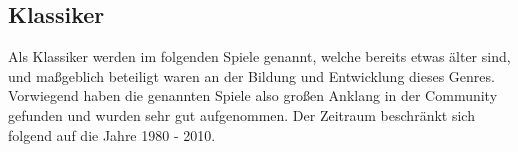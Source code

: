 \subsection{Klassiker}
Als Klassiker werden im folgenden Spiele genannt, welche bereits etwas älter sind, und maßgeblich beteiligt waren an der Bildung und Entwicklung dieses Genres. Vorwiegend haben die genannten Spiele also großen Anklang in der Community gefunden und wurden sehr gut aufgenommen. Der Zeitraum beschränkt sich folgend auf die Jahre 1980 - 2010.



